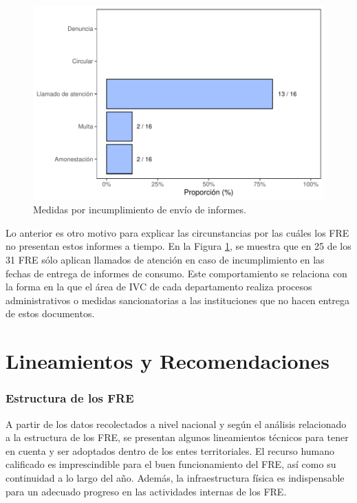 \documentclass[
  oneside]{book}
\begin{document}
\begin{figure}[b!]

{\centering \includegraphics[width=0.9\linewidth]{InformeFinal_files/figure-latex/IncumplimientoEnvioInformes-1} 

}

\caption{Medidas por incumplimiento de envío de informes.}\label{fig:IncumplimientoEnvioInformes}
\end{figure}

Lo anterior es otro motivo para explicar las circunstancias por las cuáles los FRE no presentan estos informes a tiempo. En la Figura \ref{fig:IncumplimientoEnvioInformes}, se muestra que en 25 de los 31 FRE sólo aplican llamados de atención en caso de incumplimiento en las fechas de entrega de informes de consumo. Este comportamiento se relaciona con la forma en la que el área de IVC de cada departamento realiza procesos administrativos o medidas sancionatorias a las instituciones que no hacen entrega de estos documentos.

\hypertarget{lineamientos-y-recomendaciones}{%
\chapter{Lineamientos y Recomendaciones}\label{lineamientos-y-recomendaciones}}

\hypertarget{estructura-de-los-fre}{%
\subsection{Estructura de los FRE}\label{estructura-de-los-fre}}

A partir de los datos recolectados a nivel nacional y según el análisis relacionado a la estructura de los FRE, se presentan algunos lineamientos técnicos para tener en cuenta y ser adoptados dentro de los entes territoriales. El recurso humano calificado es imprescindible para el buen funcionamiento del FRE, así como su continuidad a lo largo del año. Además, la infraestructura física es indispensable para un adecuado progreso en las actividades internas de los FRE.
\end{document}
